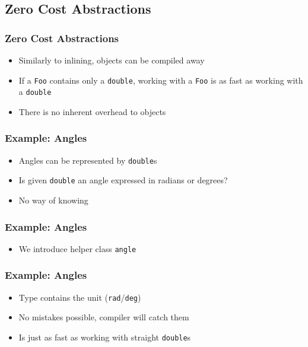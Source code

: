 \subsection{Zero Cost Abstractions}

\frame{\tableofcontents[currentsubsection]}

\begin{frame}
  \frametitle{Zero Cost Abstractions}
  \begin{itemize}
    \item Similarly to inlining, objects can be compiled away
    \item If a \texttt{Foo} contains only a \texttt{double}, working with a \texttt{Foo} is as fast as working with a \texttt{double}
    \item There is no inherent overhead to objects
  \end{itemize}
\end{frame}

\begin{frame}
  \frametitle{Example: Angles}
  \begin{itemize}
    \item Angles can be represented by \texttt{double}s
    \item Is given \texttt{double} an angle expressed in radians or degrees?
    \item No way of knowing
  \end{itemize}
\end{frame}

\begin{frame}
  \frametitle{Example: Angles}
  \begin{itemize}
    \item We introduce helper class \texttt{angle}
  \end{itemize}
\end{frame}

\begin{frame}
  \frametitle{Example: Angles}
  \begin{itemize}
    \item Type contains the unit (\texttt{rad}/\texttt{deg})
    \item No mistakes possible, compiler will catch them
    \item Is just as fast as working with straight \texttt{double}s
  \end{itemize}
\end{frame}


